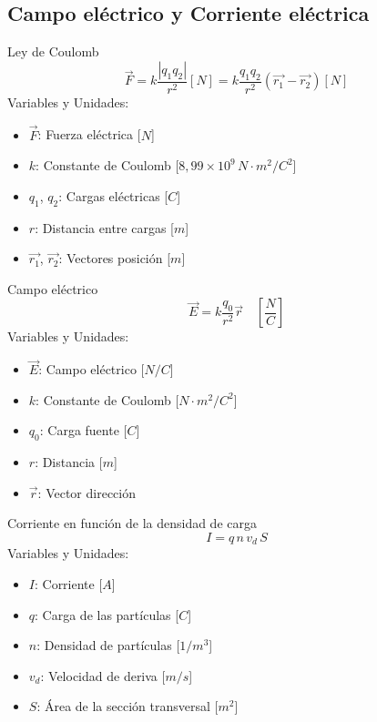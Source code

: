\begin{landscape}
\section{\textbf{Campo eléctrico y Corriente eléctrica}}

\begin{multicols}{3}

\begin{teorema}{Ley de Coulomb}
    $$\vec{F} = k\frac{|q_1q_2|}{r^2}[N] = k\frac{q_1q_2}{r^2}(\vec{r_1} - \vec{r_2}) [N]$$
    Variables y Unidades:
    \begin{itemize}
        \item $\vec{F}$: Fuerza eléctrica [$N$]
        \item $k$: Constante de Coulomb [$8,99 \times 10^9 \, N\cdot m^2/C^2$]
        \item $q_1$, $q_2$: Cargas eléctricas [$C$]
        \item $r$: Distancia entre cargas [$m$]
        \item $\vec{r_1}$, $\vec{r_2}$: Vectores posición [$m$]
    \end{itemize}
\end{teorema}

\begin{teorema}{Campo eléctrico}
    $$\vec{E} = k\frac{q_0}{r^2}\vec{r}\quad [\frac{N}{C}]$$
    Variables y Unidades:
    \begin{itemize}
        \item $\vec{E}$: Campo eléctrico [$N/C$]
        \item $k$: Constante de Coulomb [$N\cdot m^2/C^2$]
        \item $q_0$: Carga fuente [$C$]
        \item $r$: Distancia [$m$]
        \item $\vec{r}$: Vector dirección
    \end{itemize}
\end{teorema}

\begin{teorema}{Corriente en función de la densidad de carga}
    $$I = q \, n \, v_d \, S$$
    Variables y Unidades:
    \begin{itemize}
        \item $I$: Corriente [$A$]
        \item $q$: Carga de las partículas [$C$]
        \item $n$: Densidad de partículas [$1/m^3$]
        \item $v_d$: Velocidad de deriva [$m/s$]
        \item $S$: Área de la sección transversal [$m^2$]
    \end{itemize}
\end{teorema}


\end{multicols}
\end{landscape}

